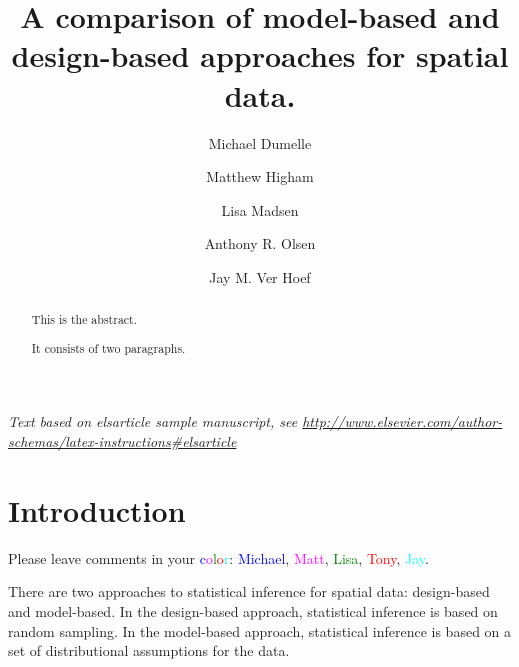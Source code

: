 \documentclass[]{elsarticle} %
\begin{document}
\begin{frontmatter}

  \title{A comparison of model-based and design-based approaches for spatial
data.}
    \author[USEPA]{Michael Dumelle}
    \author[STLAW]{Matthew Higham}
    \author[OSU]{Lisa Madsen}
  
    \author[USEPA]{Anthony R. Olsen}
  
    \author[NOAA]{Jay M. Ver Hoef}
  
      \address[USEPA]{United States Environmental Protection Agency, 200 SW 35th St,
Corvallis, Oregon, 97333}
    \address[STLAW]{Saint Lawrence University Department of Math, Computer Science, and
Statistics, 23 Romoda Drive, Canton, New York, 13617}
    \address[OSU]{Oregon State University Department of Statistics, 239 Weniger Hall,
Corvallis, Oregon, 97331}
    \address[NOAA]{Marine Mammal Laboratory, Alaska Fisheries Science Center, National
Oceanic and Atmospheric Administration, Seattle, Washington, 98115}
  
  \begin{abstract}
  This is the abstract.
  
  It consists of two paragraphs.
  \end{abstract}
  
 \end{frontmatter}

\emph{Text based on elsarticle sample manuscript, see
\url{http://www.elsevier.com/author-schemas/latex-instructions\#elsarticle}}

\hypertarget{sec:introduction}{%
\section{Introduction}\label{sec:introduction}}

Please leave comments in your
\textcolor{blue}{c}\textcolor{magenta}{o}\textcolor{green}{l}\textcolor{red}{o}\textcolor{cyan}{r}:
\textcolor{blue}{Michael}, \textcolor{magenta}{Matt},
\textcolor{green}{Lisa}, \textcolor{red}{Tony}, \textcolor{cyan}{Jay}.

There are two approaches to statistical inference for spatial data:
design-based and model-based. In the design-based approach, statistical
inference is based on random sampling. In the model-based approach,
statistical inference is based on a set of distributional assumptions
for the data.
\end{document}
